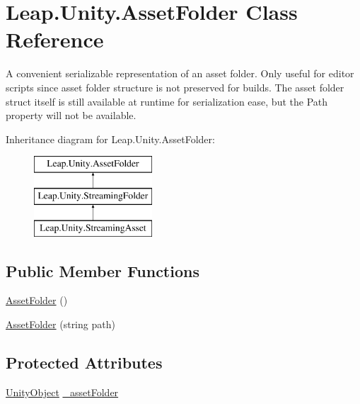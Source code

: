 \hypertarget{class_leap_1_1_unity_1_1_asset_folder}{}\section{Leap.\+Unity.\+Asset\+Folder Class Reference}
\label{class_leap_1_1_unity_1_1_asset_folder}


A convenient serializable representation of an asset folder. Only useful for editor scripts since asset folder structure is not preserved for builds. The asset folder struct itself is still available at runtime for serialization ease, but the Path property will not be available.  


Inheritance diagram for Leap.\+Unity.\+Asset\+Folder\+:\begin{figure}[H]
\begin{center}
\leavevmode
\includegraphics[height=3.000000cm]{class_leap_1_1_unity_1_1_asset_folder}
\end{center}
\end{figure}
\subsection*{Public Member Functions}
\begin{DoxyCompactItemize}
\item 
\mbox{\hyperlink{class_leap_1_1_unity_1_1_asset_folder_acbcab66af8e41b59814f26c5243e34fd}{Asset\+Folder}} ()
\item 
\mbox{\hyperlink{class_leap_1_1_unity_1_1_asset_folder_ab6ef19c5ea98ce992488456b44fc5682}{Asset\+Folder}} (string path)
\end{DoxyCompactItemize}
\subsection*{Protected Attributes}
\begin{DoxyCompactItemize}
\item 
\mbox{\hyperlink{namespace_leap_1_1_unity_1_1_attributes_a71d15e38cb19d7d2ffb1aa310ce8f0f9}{Unity\+Object}} \mbox{\hyperlink{class_leap_1_1_unity_1_1_asset_folder_a688ea58c08ad71b09caeb1e46abb355f}{\+\_\+asset\+Folder}}
\end{DoxyCompactItemize}
